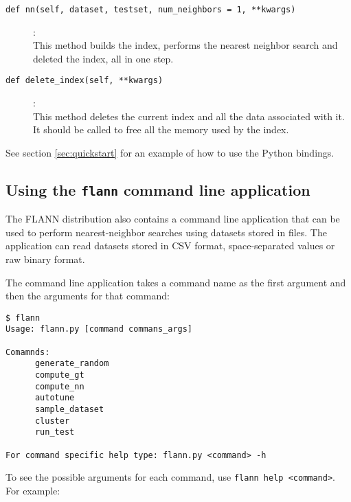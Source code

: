 \documentclass[letter,10pt]{article}
\begin{document}
\begin{description}
\item[\texttt{def nn(self, dataset, testset, num\_neighbors = 1, **kwargs)}]:\\
    This method builds the index, performs the nearest neighbor search and
deleted the index, all in one step.

\item [\texttt{def delete\_index(self, **kwargs)}] :\\
    This method deletes the current index and all the data associated with it.
It should be called to free all the memory used by the index.

\end{description}


See section \ref{sec:quickstart} for an example of how to use the Python
bindings.


\subsection{Using the \texttt{flann} command line application}

The FLANN distribution also contains a command line application that can be
used to perform nearest-neighbor searches using datasets stored in files. The
application can read datasets stored in CSV format, space-separated values or
raw binary format.

The command line application takes a command name as the first argument and
then the arguments for that command:
\begin{Verbatim}[fontsize=\footnotesize,frame=single]
$ flann
Usage: flann.py [command commans_args]

Comamnds:
      generate_random
      compute_gt
      compute_nn
      autotune
      sample_dataset
      cluster
      run_test

For command specific help type: flann.py <command> -h
\end{Verbatim}

To see the possible arguments for each command, use \texttt{flann help
<command>}. For example:
\end{document}
